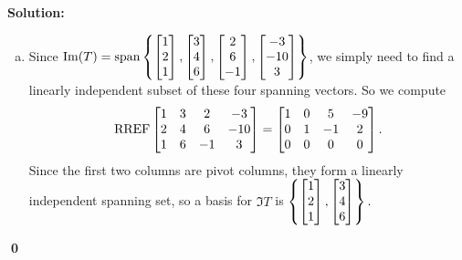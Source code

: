 \documentclass{article}
\newenvironment{solution}
{
  \ignorespaces
  \textbf{Solution:}
}
{
  \ignorespacesafterend
  \begin{flushright}
  {\bfseries \qed}
  \end{flushright}
}
\begin{document}
\begin{solution}
\begin{enumerate}[(a)]
\item Since 
\(\operatorname{Im}(T) = \operatorname{span}\left\{\begin{bmatrix}1 \\ 2 \\ 1 \end{bmatrix}, \begin{bmatrix} 3 \\ 4 \\ 6  \end{bmatrix}, \begin{bmatrix} 2 \\ 6 \\ -1 \end{bmatrix}, \begin{bmatrix} -3 \\ -10 \\ 3 \end{bmatrix}\right\}\), we simply need to find a linearly independent subset of these four spanning vectors. So we compute 
\[\operatorname{RREF} \begin{bmatrix}1 & 3 & 2 & -3 \\ 2 & 4 & 6 & -10 \\ 1 & 6 & -1 & 3 \end{bmatrix}
= \begin{bmatrix} 1 & 0 & 5 & -9 \\ 0 & 1 & -1 & 2 \\ 0 & 0 & 0 & 0\end{bmatrix}.\]
Since the first two columns are pivot columns, they form a linearly independent spanning set, so a basis for \(\Im T\) is \(\left\{\begin{bmatrix}1\\2\\1 \end{bmatrix}, \begin{bmatrix}3\\4\\6 \end{bmatrix}\right\}.\)


\end{enumerate}
\end{solution}
\end{document}
